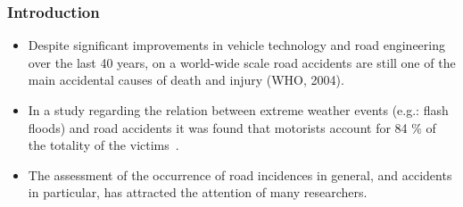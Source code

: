\documentclass[hyperref={pdfpagelabels=true}]{beamer}
\begin{document}
\begin{frame}
\frametitle{Introduction}
\begin{overprint}
\begin{itemize}
\item Despite significant improvements in vehicle technology and road engineering over the last 40 years, on a world-wide scale 
road accidents are still one of the main accidental causes of death and injury (WHO, 2004).\\
\item In a study regarding the relation between extreme weather events (e.g.: flash floods) and road accidents it was found that motorists account for 84 \% of the totality of the
victims~\cite{calabria}.
\item The assessment of the occurrence of road incidences in general, and accidents in particular, has attracted the attention of many researchers.
\end{itemize}
\end{overprint}
\end{frame}
\end{document}
